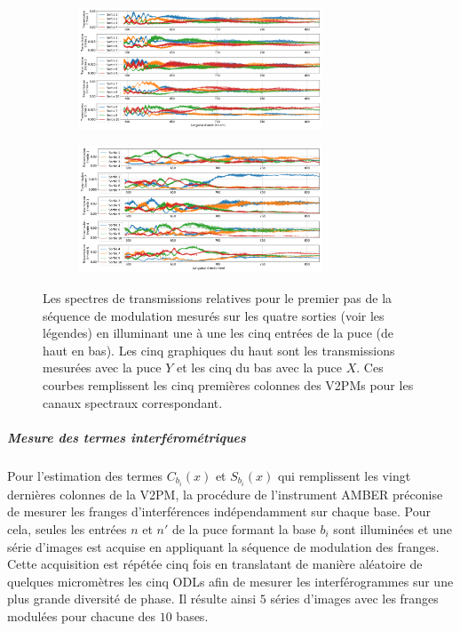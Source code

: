 \begin{figure}[ht!]
    \begin{subfigure}{\textwidth}
        \centering
        \includegraphics[width=0.8\textwidth]{Figure_Chap3/20221010_P2VM_01_SpectralThroughput.png}
    \end{subfigure}
    \begin{subfigure}{\textwidth}
        \centering
        \includegraphics[width=0.8\textwidth]{Figure_Chap3/20220811_P2VM_01_SpectralThroughput.png}
    \end{subfigure}
    \caption[Transmissions relatives mesurées sur chaque entrée des puces $Y$ et $X$, constituant les 5 premières colonnes de la V2PM.]{Les spectres de transmissions relatives pour le premier pas de la séquence de modulation mesurés sur les quatre sorties (voir les légendes) en illuminant une à une les cinq entrées de la puce (de haut en bas). Les cinq graphiques du haut sont les transmissions mesurées avec la puce $Y$ et les cinq du bas avec la puce $X$. Ces courbes remplissent les cinq premières colonnes des V2PMs pour les canaux spectraux correspondant.}
    \label{fig:V2PMtransmission}
\end{figure}


\subparagraph{Mesure des termes interférométriques \\}

Pour l'estimation des termes $C_{b_i}(x)$ et $S_{b_i}(x)$ qui remplissent les vingt dernières colonnes de la \ac{V2PM}, la procédure de l'instrument \ac{AMBER} préconise de mesurer les franges d'interférences indépendamment sur chaque base. Pour cela, seules les entrées $n$ et $n'$ de la puce formant la base $b_i$ sont illuminées et une série d'images est acquise en appliquant la séquence de modulation des franges. Cette acquisition est répétée cinq fois en translatant de manière aléatoire de quelques micromètres les cinq \ac{ODL}s afin de mesurer les interférogrammes sur une plus grande diversité de phase. Il résulte ainsi $5$ séries d'images avec les franges modulées pour chacune des $10$ bases.


